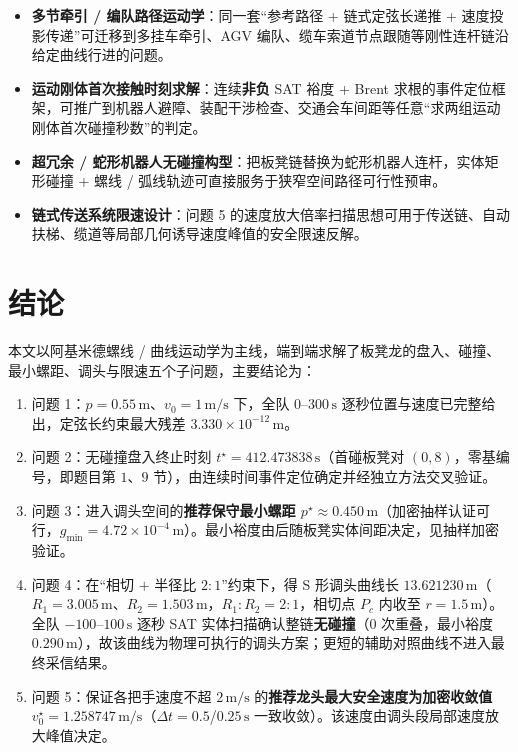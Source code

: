 \documentclass[a4paper, 12pt]{ctexart}
\begin{document}
\begin{itemize}[leftmargin=2em]
  \item \textbf{多节牵引 / 编队路径运动学}：同一套“参考路径 + 链式定弦长递推 + 速度投影传递”可迁移到多挂车牵引、AGV 编队、缆车索道节点跟随等刚性连杆链沿给定曲线行进的问题。
  \item \textbf{运动刚体首次接触时刻求解}：连续\textbf{非负} SAT 裕度 + Brent 求根的事件定位框架，可推广到机器人避障、装配干涉检查、交通会车间距等任意“求两组运动刚体首次碰撞秒数”的判定。
  \item \textbf{超冗余 / 蛇形机器人无碰撞构型}：把板凳链替换为蛇形机器人连杆，实体矩形碰撞 + 螺线 / 弧线轨迹可直接服务于狭窄空间路径可行性预审。
  \item \textbf{链式传送系统限速设计}：问题 5 的速度放大倍率扫描思想可用于传送链、自动扶梯、缆道等局部几何诱导速度峰值的安全限速反解。
\end{itemize}

\section{结论}

本文以阿基米德螺线 / 曲线运动学为主线，端到端求解了板凳龙的盘入、碰撞、最小螺距、调头与限速五个子问题，主要结论为：

\begin{enumerate}[leftmargin=2em]
  \item 问题 1：$p=0.55\,\mathrm{m}$、$v_0=1\,\mathrm{m/s}$ 下，全队 $0$--$300\,\mathrm{s}$ 逐秒位置与速度已完整给出，定弦长约束最大残差 $3.330\times10^{-12}\,\mathrm{m}$。
  \item 问题 2：无碰撞盘入终止时刻 $t^\star=412.473838\,\mathrm{s}$（首碰板凳对 $(0,8)$，零基编号，即题目第 $1$、$9$ 节），由连续时间事件定位确定并经独立方法交叉验证。
  \item 问题 3：进入调头空间的\textbf{推荐保守最小螺距 $p^\star\approx0.450\,\mathrm{m}$}（加密抽样认证可行，$g_{\min}=4.72\times10^{-4}\,\mathrm{m}$）。最小裕度由后随板凳实体间距决定，见抽样加密验证。
  \item 问题 4：在“相切 $+$ 半径比 $2{:}1$”约束下，得 S 形调头曲线长 $13.621230\,\mathrm{m}$（$R_1=3.005\,\mathrm{m}$、$R_2=1.503\,\mathrm{m}$，$R_1{:}R_2=2{:}1$，相切点 $P_c$ 内收至 $r=1.5\,\mathrm{m}$）。全队 $-100$--$100\,\mathrm{s}$ 逐秒 SAT 实体扫描确认整链\textbf{无碰撞}（$0$ 次重叠，最小裕度 $0.290\,\mathrm{m}$），故该曲线为物理可执行的调头方案；更短的辅助对照曲线不进入最终采信结果。
  \item 问题 5：保证各把手速度不超 $2\,\mathrm{m/s}$ 的\textbf{推荐龙头最大安全速度为加密收敛值 $v_0^\star=1.258747\,\mathrm{m/s}$}（$\Delta t=0.5$/$0.25\,\mathrm{s}$ 一致收敛）。该速度由调头段局部速度放大峰值决定。
\end{enumerate}
\end{document}
